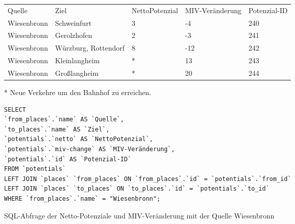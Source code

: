 \begin{tabularx}{\textwidth}{*5{X}}
Quelle & Ziel & NettoPotenzial & MIV-Veränderung & Potenzial-ID\\ 
Wiesenbronn & Schweinfurt & 3 & -4 & 240\\ 
Wiesenbronn & Gerolzhofen & 2 & -3 & 241\\ 
Wiesenbronn & Würzburg, Rottendorf & 8 & -12 & 242\\ 
Wiesenbronn & Kleinlangheim & * & 13 & 243\\ 
Wiesenbronn & Großlangheim & * & 20 & 244\\ 
\end{tabularx}
\newline
\newline
* Neue Verkehre um den Bahnhof zu erreichen.
\newline
\begin{listing}[htbp]
\begin{verbatim}
SELECT
`from_places`.`name` AS `Quelle`, 
`to_places`.`name` AS `Ziel`, 
`potentials`.`netto` AS `NettoPotenzial`, 
`potentials`.`miv-change` AS `MIV-Veränderung`, 
`potentials`.`id` AS `Potenzial-ID`
FROM `potentials`
LEFT JOIN `places` `from_places` ON `from_places`.`id` = `potentials`.`from_id`
LEFT JOIN `places` `to_places` ON `to_places`.`id` = `potentials`.`to_id`
WHERE `from_places`.`name` = "Wiesenbronn";
\end{verbatim}
\caption{SQL-Abfrage der Netto-Potenziale und MIV-Veränderung mit der Quelle Wiesenbronn}\label{lst-fz-wiesenbronn}
\end{listing}